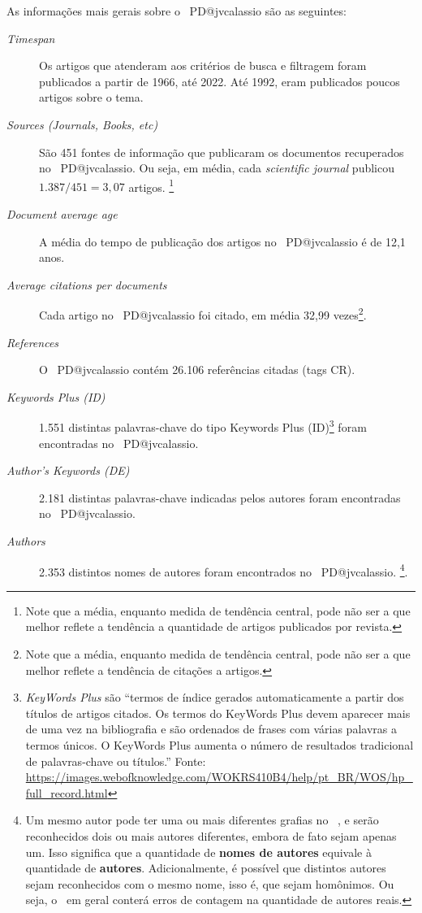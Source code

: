 As informações mais gerais sobre o \dataset\   PD@jvcalassio são as seguintes:
\begin{description}
    \item [\textit{Timespan}] Os artigos que atenderam aos critérios de busca e filtragem foram publicados a partir de 1966, até 2022. Até 1992, eram publicados poucos artigos sobre o tema.
    \item [\textit{Sources (Journals, Books, etc)}] São 451 fontes de informação que publicaram os documentos recuperados no \dataset\   PD@jvcalassio. Ou seja, em média, cada \textit{scientific journal} publicou $1.387/451=3,07$ artigos. \footnote{Note que a média, enquanto medida de tendência central, pode não ser a que melhor reflete a tendência a quantidade de artigos publicados por revista.}
    \item [\textit{Document average age}] A média do tempo de publicação dos artigos no \dataset\   PD@jvcalassio é de 12,1 anos.
    \item [\textit{Average citations per documents}] Cada artigo no \dataset\   PD@jvcalassio foi citado, em média 32,99 vezes\footnote{Note que a média, enquanto medida de tendência central, pode não ser a que melhor reflete a tendência de  citações a artigos.}.
    \item [\textit{References}] O \dataset\   PD@jvcalassio contém 26.106 referências citadas (tags CR).
    \item [\textit{Keywords Plus (ID)}] 1.551 distintas palavras-chave do tipo Keywords Plus (ID)\footnote{\textit{KeyWords Plus} são ``termos de índice gerados automaticamente a partir dos títulos de artigos citados. Os termos do KeyWords Plus devem aparecer mais de uma vez na bibliografia e são ordenados de frases com várias palavras a termos únicos. O KeyWords Plus aumenta o número de resultados tradicional de palavras-chave ou títulos.'' Fonte: \url{https://images.webofknowledge.com/WOKRS410B4/help/pt_BR/WOS/hp_full_record.html}} foram encontradas no \dataset\   PD@jvcalassio. 
    \item [\textit{Author's Keywords (DE)}] 2.181 distintas palavras-chave indicadas pelos autores foram encontradas no \dataset\  PD@jvcalassio.
    \item [\textit{Authors}] 2.353 distintos nomes de autores foram encontrados no \dataset\ PD@jvcalassio. \footnote{Um mesmo autor pode ter uma ou mais diferentes grafias no \dataset\  , e serão reconhecidos dois ou mais autores diferentes, embora de fato sejam apenas um. Isso significa que a quantidade de \textbf{nomes de autores} equivale à quantidade de \textbf{autores}. Adicionalmente, é possível que distintos autores sejam reconhecidos com o mesmo nome, isso é, que sejam homônimos. Ou seja, o \dataset\   em geral conterá erros de contagem na quantidade de autores reais.}.

\end{description}
